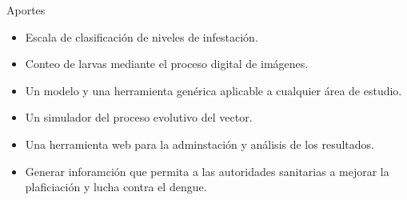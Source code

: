 \begin{frame}[t]{Aportes}
    \begin{itemize}
        \item Escala de clasificación de niveles de infestación.
        \item Conteo de larvas mediante el proceso digital de imágenes.
        \item Un modelo y una herramienta genérica aplicable a cualquier área de estudio.
        \item Un simulador del proceso evolutivo del vector.
        \item Una herramienta web para la adminstación y análisis de los resultados.
        \item Generar inforamción que permita a las autoridades sanitarias a mejorar la plaficiación y lucha contra el dengue.
    \end{itemize}
\end{frame}
